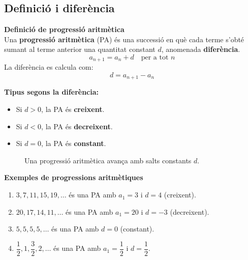 \documentclass[12pt]{article}
\begin{document}
\subsection{Definició i diferència}

\begin{concept}
\textbf{Definició de progressió aritmètica}\\
Una \textbf{progressió aritmètica} (PA) és una successió en què cada terme s'obté sumant al terme anterior una quantitat constant $d$, anomenada \textbf{diferència}.
\[
a_{n+1} = a_n + d \quad \text{per a tot } n
\]
La diferència es calcula com:
\[
d = a_{n+1} - a_n
\]

\textbf{Tipus segons la diferència:}
\begin{itemize}
    \item Si $d > 0$, la PA és \textbf{creixent}.
    \item Si $d < 0$, la PA és \textbf{decreixent}.
    \item Si $d = 0$, la PA és \textbf{constant}.
\end{itemize}
\end{concept}

\begin{figure}[H]
\centering
{}
\caption{Una progressió aritmètica avança amb salts constants $d$.}
\end{figure}

\begin{exemple}
\textbf{Exemples de progressions aritmètiques}
\begin{enumerate}[label=\alph*)]
    \item $3, 7, 11, 15, 19, \dots$ és una PA amb $a_1 = 3$ i $d = 4$ (creixent).
    \item $20, 17, 14, 11, \dots$ és una PA amb $a_1 = 20$ i $d = -3$ (decreixent).
    \item $5, 5, 5, 5, \dots$ és una PA amb $d = 0$ (constant).
    \item $\dfrac{1}{2}, 1, \dfrac{3}{2}, 2, \dots$ és una PA amb $a_1 = \dfrac{1}{2}$ i $d = \dfrac{1}{2}$.
\end{enumerate}
\end{exemple}
\end{document}
